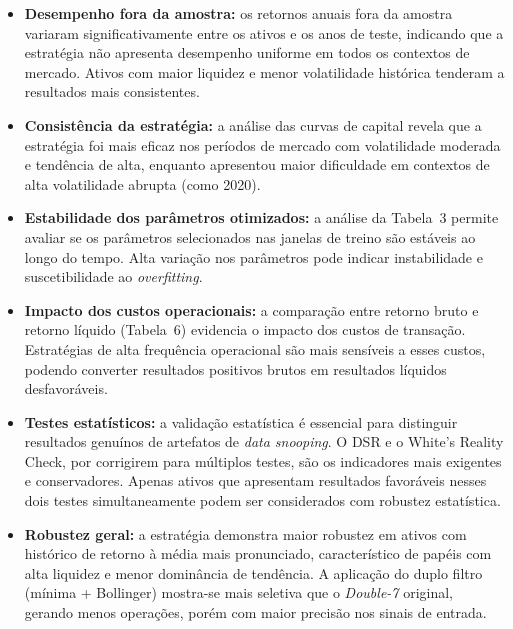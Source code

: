 \documentclass[a4paper,10pt]{article}
\begin{document}
\begin{itemize}
  \item \textbf{Desempenho fora da amostra:} os retornos anuais fora da amostra variaram significativamente entre os ativos e os anos de teste, indicando que a estratégia não apresenta desempenho uniforme em todos os contextos de mercado. Ativos com maior liquidez e menor volatilidade histórica tenderam a resultados mais consistentes.

  \item \textbf{Consistência da estratégia:} a análise das curvas de capital revela que a estratégia foi mais eficaz nos períodos de mercado com volatilidade moderada e tendência de alta, enquanto apresentou maior dificuldade em contextos de alta volatilidade abrupta (como 2020).

  \item \textbf{Estabilidade dos parâmetros otimizados:} a análise da Tabela~3 permite avaliar se os parâmetros selecionados nas janelas de treino são estáveis ao longo do tempo. Alta variação nos parâmetros pode indicar instabilidade e suscetibilidade ao \textit{overfitting}.

  \item \textbf{Impacto dos custos operacionais:} a comparação entre retorno bruto e retorno líquido (Tabela~6) evidencia o impacto dos custos de transação. Estratégias de alta frequência operacional são mais sensíveis a esses custos, podendo converter resultados positivos brutos em resultados líquidos desfavoráveis.

  \item \textbf{Testes estatísticos:} a validação estatística é essencial para distinguir resultados genuínos de artefatos de \textit{data snooping}. O DSR e o White's Reality Check, por corrigirem para múltiplos testes, são os indicadores mais exigentes e conservadores. Apenas ativos que apresentam resultados favoráveis nesses dois testes simultaneamente podem ser considerados com robustez estatística.

  \item \textbf{Robustez geral:} a estratégia demonstra maior robustez em ativos com histórico de retorno à média mais pronunciado, característico de papéis com alta liquidez e menor dominância de tendência. A aplicação do duplo filtro (mínima + Bollinger) mostra-se mais seletiva que o \textit{Double-7} original, gerando menos operações, porém com maior precisão nos sinais de entrada.
\end{itemize}
\end{document}
